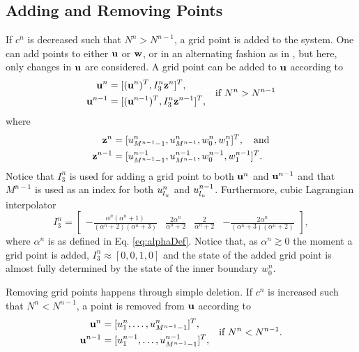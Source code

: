 \documentclass[fleqn]{jaes}
\begin{document}
\subsection{Adding and Removing Points}\label{sec:addRemove}
If $c^n$ is decreased such that $N^n > N^{n-1}$, a grid point is added to the system. One can add points to either $\mathbf{u}$ or $\mathbf{w}$, or in an alternating fashion as in \cite{Willemsen2021a}, but here, only changes in $\mathbf{u}$ are considered. A grid point can be added to $\mathbf{u}$ according to
\begin{equation}
\begin{aligned}
    \u^n &= [(\u^n)^T, I_3^n\z^n]^T,\\
    \u^{n-1} &= [(\u^{n-1})^T, I_3^n\z^{n-1}]^T,\\
\end{aligned} \quad \text{if } N^n > N^{n-1}
\end{equation}
where
\begin{equation*}
    \begin{aligned}
        \z^n &= [u_{M^{n-1}-1}^n, u_{M^{n-1}}^n, w_0^n, w_1^n]^T, \quad \text{and}\\
        \z^{n-1} &= [u_{M^{n-1}-1}^{n-1}, u_{M^{n-1}}^{n-1}, w_0^{n-1}, w_1^{n-1}]^T.
    \end{aligned}
\end{equation*}
Notice that $I_3^n$ is used for adding a grid point to both $\mathbf{u}^n$ and $\mathbf{u}^{n-1}$ and that $M^{n-1}$ is used as an index for both $u^n_{l_u}$ and $u^{n-1}_{l_u}$.
Furthermore, cubic Lagrangian interpolator
\begin{equation}\label{eq:customIp}
    I_3^n = \begin{bmatrix} -\frac{\alpha^n(\alpha^n+1)}{(\alpha^n+2)(\alpha^n+3)} &\frac{2\alpha^n}{\alpha^n+2} &\frac{2}{\alpha^n+2} 
    &-\frac{2\alpha^n}{(\alpha^n+3)(\alpha^n+2)}
    \end{bmatrix},
\end{equation}
where $\alpha^n$ is as defined in Eq. \eqref{eq:alphaDef}. Notice that, as $\alpha^n \gtrsim 0$ the moment a grid point is added, $I_3^n\approx [0, 0, 1, 0]$ and the state of the added grid point is almost fully determined by the state of the inner boundary $w_0^n$. 

Removing grid points happens through simple deletion. If $c^n$ is increased such that $N^n < N^{n-1}$, a point is removed from $\mathbf{u}$ according to
\begin{equation}
\begin{aligned}
    \u^n &= [u_1^n, \hdots, u_{M^{n-1}-1}^n]^T,\\
    \u^{n-1} &= [u_1^{n-1}, \hdots, u_{M^{n-1}-1}^{n-1}]^T,
    \end{aligned} \quad \text{if } N^n < N^{n-1}.
\end{equation}
\end{document}
